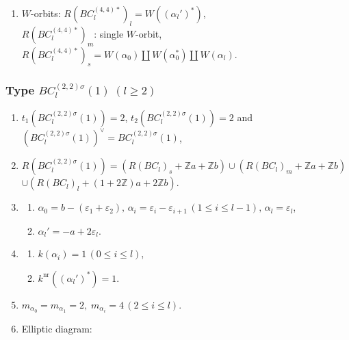 \documentclass[11pt]{amsart}
\newcommand{\Z}{\mathbb{Z}}
\newcommand{\nr}{\mathrm{nr}}
\newcommand{\vep}{\varepsilon}
\begin{document}
{\begin{enumerate}
\begin{center}
{}
\end{center}

\item $W$-orbits: $R(BC_l^{(4,4)\ast})_l=W((\alpha_l')^\ast)$, \\
\phantom{$W$-orbits:}  $R(BC_l^{(4,4)\ast})_m$: single $W$-orbit, \\
\phantom{$W$-orbits:} 
$R(BC_l^{(4,4)\ast})_s=W(\alpha_0) \amalg W(\alpha_0^\ast) \amalg W(\alpha_l)$.
\end{enumerate}


\subsubsection{Type $BC_l^{(2,2)\sigma}(1)\; (l\geq 2)$}\label{data:BC-5}
\begin{enumerate}
\item $t_1(BC_l^{(2,2)\sigma}(1))=2$, \; $t_2(BC_l^{(2,2)\sigma}(1))=2$ and  \\
$(BC_l^{(2,2)\sigma}(1))^\vee=BC_l^{(2,2)\sigma}(1)$,
\item $R(BC_l^{(2,2)\sigma}(1))=(R(BC_l)_s+\Z a+\Z b) \cup (R(BC_l)_m+\Z a+\Z b)$ \\
 $\cup (R(BC_l)_l+(1+2\Z) a+2\Z b)$. 
\item 
\begin{enumerate}
\item[i)] $\alpha_0=b-(\vep_1+\vep_2), \, \alpha_i=\vep_i-\vep_{i+1}\, 
(1\leq i\leq l-1), \, \alpha_l=\vep_l$, 
\item[ii)] $\alpha_l'= -a+2\vep_l$.
\end{enumerate}
\item 
\begin{enumerate}
\item[i)] $k(\alpha_i)=1\, (0\leq i\leq l)$, 
\item[ii)] $k^{\nr}((\alpha_l')^\ast)=1$. 
\end{enumerate}
\item $m_{\alpha_0}=m_{\alpha_1}=2, \; m_{\alpha_i}=4\, 
(2\leq i\leq l)$.
\item Elliptic diagram:


\begin{center}
\scalebox{0.75}{
\begin{tikzpicture}[scale=0.9]


\end{tikzpicture}}
\end{center}
\end{enumerate}}
\end{document}
